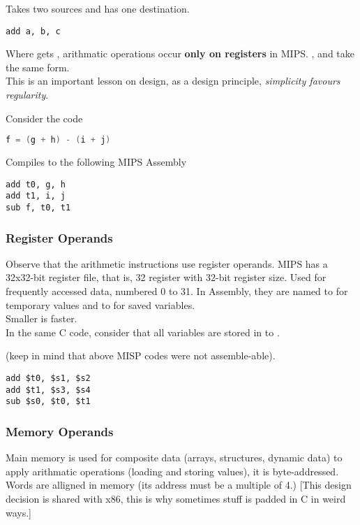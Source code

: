 \documentclass[11pt,a4paper,twocolumn]{book}
\begin{document}
Takes two sources and has one destination.

\begin{lstlisting}
add a, b, c
\end{lstlisting}

Where  gets , arithmatic operations occur \textbf{only on registers} in MIPS. ,  and  take the same form.\\

This is an important lesson on design, as a design principle, \textit{simplicity favours regularity}.

Consider the code

\begin{lstlisting}[language=C]
f = (g + h) - (i + j)
\end{lstlisting}

Compiles to the following MIPS Assembly

\begin{lstlisting}
add t0, g, h
add t1, i, j
sub f, t0, t1
\end{lstlisting}

\subsubsection{Register Operands}

Observe that the arithmetic instructions use register operands. MIPS has a 32x32-bit register file, that is, 32 register with 32-bit register size. Used for frequently accessed data, numbered 0 to 31. In Assembly, they are named  to  for temporary values and  to  for saved variables.\\

Smaller is faster.\\

In the same C code, consider that all variables are stored in  to . 

(keep in mind that above MISP codes were not assemble-able).
\begin{lstlisting}
add $t0, $s1, $s2
add $t1, $s3, $s4
sub $s0, $t0, $t1
\end{lstlisting}

\subsubsection{Memory Operands}

Main memory is used for composite data (arrays, structures, dynamic data) to apply arithmatic operations (loading and storing values), it is byte-addressed. Words are alligned in memory (its address must be a multiple of 4.) [This design decision is shared with x86, this is why sometimes stuff is padded in C in weird ways.]\\
\end{document}
